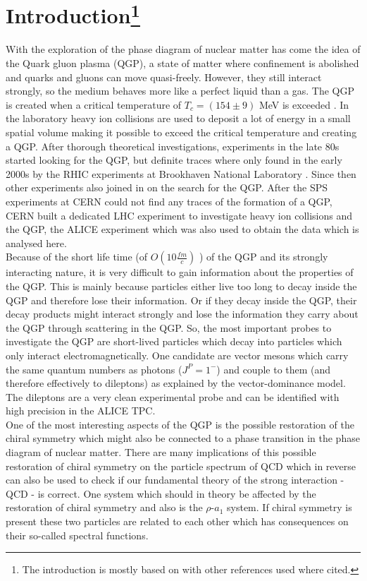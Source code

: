 \section{Introduction\footnote{The introduction is mostly based on \cite{ChiSym} with other references used where cited.}}
\label{sec:Introduction}
With the exploration of the phase diagram of nuclear matter has come the idea of the Quark gluon plasma (QGP), a state of matter where confinement is abolished and quarks and gluons can move quasi-freely. However, they still interact strongly, so the medium behaves more like a perfect liquid than a gas. The QGP is created when a critical temperature of $T_c = (154 \pm 9)$ MeV is exceeded \cite{tcrit}. In the laboratory heavy ion collisions are used to deposit a lot of energy in a small spatial volume making it possible to exceed the critical temperature and creating a QGP. After thorough theoretical investigations, experiments in the late 80s started looking for the QGP, but definite traces where only found in the early 2000s by the RHIC experiments at Brookhaven National Laboratory \cite{QGPrhic}. Since then other experiments also joined in on the search for the QGP. After the SPS experiments at CERN could not find any traces of the formation of a QGP, CERN built a dedicated LHC experiment to investigate heavy ion collisions and the QGP, the ALICE experiment \cite{ALICEproposal} which was also used to obtain the data which is analysed here. \\
Because of the short life time (of $O(10 \frac{fm}{c})$ \cite{QGPlifetime}) of the QGP and its strongly interacting nature, it is very difficult to gain information about the properties of the QGP. This is mainly because particles either live too long to decay inside the QGP and therefore lose their information. Or if they decay inside the QGP, their decay products might interact strongly and lose the information they carry about the QGP through scattering in the QGP. So, the most important probes to investigate the QGP are short-lived particles which decay into particles which only interact electromagnetically. One candidate are vector mesons which carry the same quantum numbers as photons ($J^P = 1^{-}$) and couple to them (and therefore effectively to dileptons) as explained by the vector-dominance model. The dileptons are a very clean experimental probe and can be identified with high precision in the ALICE TPC. \\
One of the most interesting aspects of the QGP is the possible restoration of the chiral symmetry which might also be connected to a phase transition in the phase diagram of nuclear matter. There are many implications of this possible restoration of chiral symmetry on the particle spectrum of QCD which in reverse can also be used to check if our fundamental theory of the strong interaction - QCD - is correct. One system which should in theory be affected by the restoration of chiral symmetry and also  is the $\rho$-$a_1$ system. If chiral symmetry is present these two particles are related to each other which has consequences on their so-called spectral functions. \\
